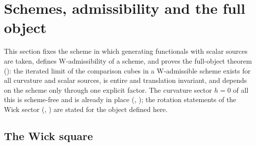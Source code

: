 \section{Schemes, admissibility and the full object}

This section fixes the scheme in which generating functionals with scalar sources are taken, defines $\mathrm W$-admissibility of a scheme, and proves the full-object theorem (): the iterated limit of the comparison cubes in a $\mathrm W$-admissible scheme exists for all curvature and scalar sources, is entire and translation invariant, and depends on the scheme only through one explicit factor. The curvature sector $h=0$ of all this is scheme-free and is already in place (, ); the rotation statements of the Wick sector (, ) are stated for the object defined here.

\subsection{The Wick square}

